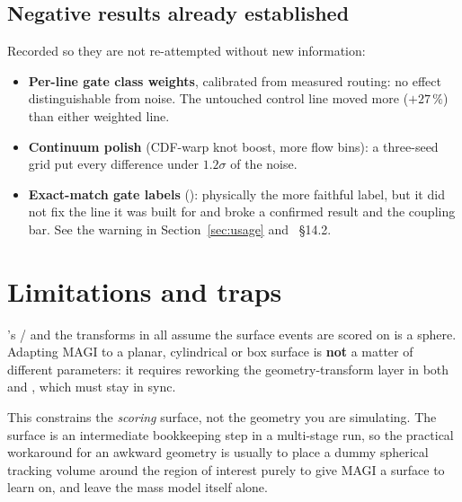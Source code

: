 \documentclass[11pt,a4paper]{article}
\begin{document}
\subsection{Negative results already established}

Recorded so they are not re-attempted without new information:

\begin{itemize}[nosep]
  \item \textbf{Per-line gate class weights}, calibrated from measured routing:
    no effect distinguishable from noise. The untouched control line moved more
    ($+27\,\%$) than either weighted line.
  \item \textbf{Continuum polish} (CDF-warp knot boost, more flow bins):
    a three-seed grid put every difference under $1.2\sigma$ of the noise.
  \item \textbf{Exact-match gate labels}
    (): physically the more faithful label, but
    it did not fix the line it was built for and broke a confirmed result and
    the coupling bar. See the warning in Section~\ref{sec:usage} and
    ~\S14.2.
\end{itemize}

\section{Limitations and traps}
\label{sec:limits}

\begin{magiwarn}
's / and the
transforms in  all assume the surface events are scored
on is a sphere. Adapting MAGI to a planar, cylindrical or box surface is
\textbf{not} a matter of different parameters: it requires reworking the
geometry-transform layer in both  and
, which must stay in sync.

This constrains the \emph{scoring} surface, not the geometry you are
simulating. The surface is an intermediate bookkeeping step in a multi-stage
run, so the practical workaround for an awkward geometry is usually to place a
dummy spherical tracking volume around the region of interest purely to give
MAGI a surface to learn on, and leave the mass model itself alone.
\end{magiwarn}
\end{document}
